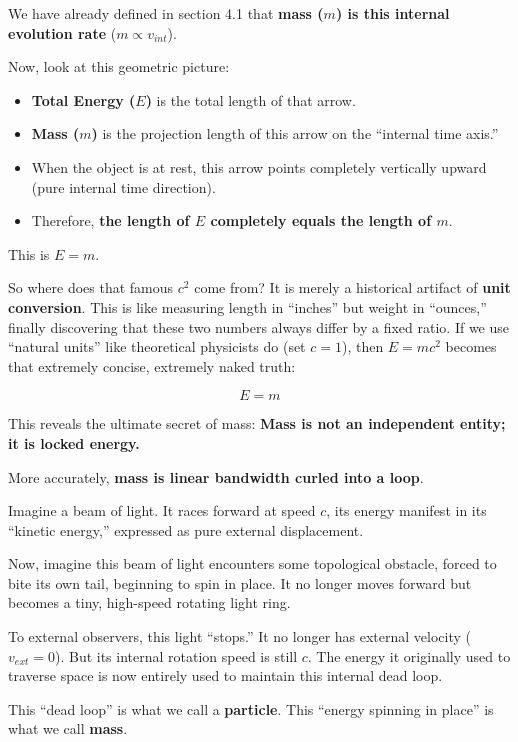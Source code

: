 We have already defined in section 4.1 that \textbf{mass ($m$) is this internal evolution rate} ($m \propto v_{int}$).

Now, look at this geometric picture:

\begin{itemize}
\item \textbf{Total Energy ($E$)} is the total length of that arrow.

\item \textbf{Mass ($m$)} is the projection length of this arrow on the ``internal time axis.''

\item When the object is at rest, this arrow points completely vertically upward (pure internal time direction).

\item Therefore, \textbf{the length of $E$ completely equals the length of $m$}.
\end{itemize}

This is $E=m$.

So where does that famous $c^2$ come from? It is merely a historical artifact of \textbf{unit conversion}. This is like measuring length in ``inches'' but weight in ``ounces,'' finally discovering that these two numbers always differ by a fixed ratio. If we use ``natural units'' like theoretical physicists do (set $c=1$), then $E=mc^2$ becomes that extremely concise, extremely naked truth:

$$E = m$$

This reveals the ultimate secret of mass: \textbf{Mass is not an independent entity; it is locked energy.}

More accurately, \textbf{mass is linear bandwidth curled into a loop}.

Imagine a beam of light. It races forward at speed $c$, its energy manifest in its ``kinetic energy,'' expressed as pure external displacement.

Now, imagine this beam of light encounters some topological obstacle, forced to bite its own tail, beginning to spin in place. It no longer moves forward but becomes a tiny, high-speed rotating light ring.

To external observers, this light ``stops.'' It no longer has external velocity ($v_{ext}=0$). But its internal rotation speed is still $c$. The energy it originally used to traverse space is now entirely used to maintain this internal dead loop.

This ``dead loop'' is what we call a \textbf{particle}. This ``energy spinning in place'' is what we call \textbf{mass}.

